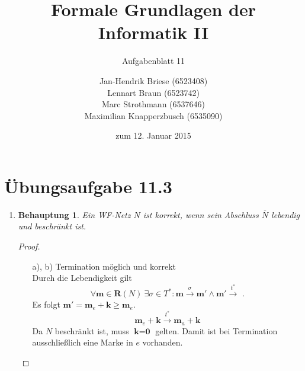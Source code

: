 \documentclass[a4paper]{scrartcl}
\title{Formale Grundlagen der Informatik II}
\subtitle{Aufgabenblatt 11}
\author{
    Jan-Hendrik Briese (6523408) \\
    Lennart Braun (6523742) \\
    Marc Strothmann (6537646) \\
    Maximilian Knapperzbusch (6535090)
}
\date{zum 12. Januar 2015}
\newtheorem*{behaupt}{Behauptung}
\begin{document}
\maketitle

\section*{Übungsaufgabe 11.3} 
\begin{enumerate}
    \item
        \begin{behaupt}
            Ein WF-Netz $N$ ist korrekt, wenn sein Abschluss $\overline{N}$
            lebendig und beschränkt ist.
        \end{behaupt}
        \begin{proof} \hfill \\
            \begin{enumerate}
                \item[a), b)] Termination möglich und korrekt \\
                    Durch die Lebendigkeit gilt
                    \begin{equation}
                        \forall \textbf{m} \in \textbf{R}(N) \ 
                        \exists \sigma \in T^* :
                        \textbf{m} \stackrel{\sigma}{\longrightarrow}
                        \textbf{m}' \land
                        \textbf{m}' \stackrel{t^*}{\longrightarrow}
                        \text{ .}
                    \end{equation}
                    Es folgt
                    $\textbf{m}' = \textbf{m}_e + \textbf{k} \geq \textbf{m}_e$.
                    \begin{equation}
                        \textbf{m}_e + \textbf{k}
                         \stackrel{t^*}{\longrightarrow}
                        \textbf{m}_a + \textbf{k}
                    \end{equation}
                    Da $N$ beschränkt ist, muss $\textbf{k} = \textbf{0}$
                    gelten.
                    Damit ist bei Termination ausschließlich eine Marke in $e$
                    vorhanden.


\end{enumerate}
\end{proof}
\end{enumerate}
\end{document}
